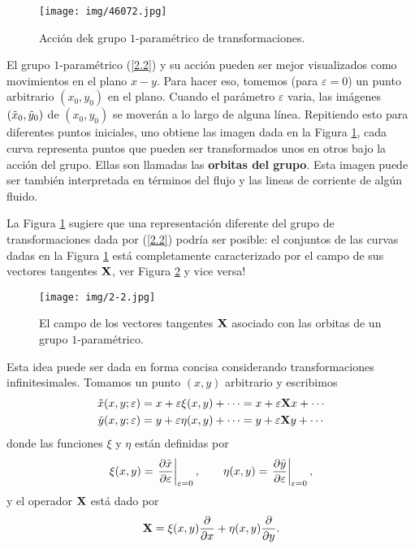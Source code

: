 \begin{figure}[h!]
    \centering
    \texttt{[image: img/46072.jpg]}
    \caption{Acción dek grupo $1$-paramétrico de transformaciones.}
    \label{fig:2-1}
\end{figure}

El grupo $1$-paramétrico (\ref{2.2}) y su acción pueden ser mejor visualizados como movimientos en el plano $x-y$. Para hacer eso, tomemos (para $\varepsilon=0$) un punto arbitrario $(x_0,y_0)$ en el plano. Cuando el parámetro $\varepsilon$ varia, las imágenes $(\Tilde{x}_0,\Tilde{y}_0)$ de $(x_0,y_0)$ se moverán a lo largo de alguna línea. Repitiendo esto para diferentes puntos iniciales, uno obtiene las imagen dada en la Figura \ref{fig:2-1}, cada curva representa puntos que pueden ser transformados unos en otros bajo la acción del grupo. Ellas son llamadas las \textbf{orbitas del grupo}. Esta imagen puede ser también interpretada en términos del flujo y las lineas de corriente de algún fluido.

La Figura \ref{fig:2-1} sugiere que una representación diferente del grupo de transformaciones dada por (\ref{2.2}) podría ser posible: el conjuntos de las curvas dadas en la Figura \ref{fig:2-1} está completamente caracterizado por el campo de sus vectores tangentes $\vb{X}$, ver Figura \ref{fig:2-2}  y vice versa!

\begin{figure}[h]
    \centering
    \texttt{[image: img/2-2.jpg]}
    \caption{El campo de los vectores tangentes $\vb{X}$ asociado con las orbitas de un grupo $1$-paramétrico.}
    \label{fig:2-2}
\end{figure}

Esta idea puede ser dada en forma concisa considerando transformaciones infinitesimales. Tomamos un punto $(x,y)$ arbitrario y escribimos
\begin{align}\label{2.7}
\begin{split}
    \Tilde{x}(x,y;\varepsilon)&=x+\varepsilon\xi(x,y)+\cdots=x+\varepsilon\vb{X}x+\cdots\\
    \Tilde{y}(x,y;\varepsilon)&=y+\varepsilon\eta(x,y)+\cdots=y+\varepsilon\vb{X}y+\cdots
\end{split}
\end{align}
donde las funciones $\xi$ y $\eta$ están definidas por
\begin{equation}\label{2.8}
    \xi(x,y)=\eval{\pdv{\Tilde{x}}{\varepsilon}}_{\varepsilon=0},\qquad \eta(x,y)=\eval{\pdv{\Tilde{y}}{\varepsilon}}_{\varepsilon=0},
\end{equation}
y el operador $\vb{X}$ está dado por
\begin{equation}\label{2.9}
    \vb{X}=\xi(x,y)\pdv{x}+\eta(x,y)\pdv{y}.
\end{equation}

